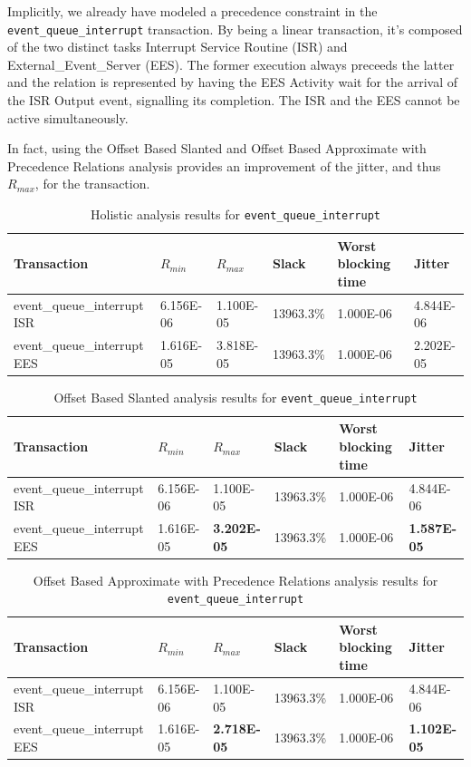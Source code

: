 \documentclass{article}
\begin{document}
Implicitly, we already have modeled a precedence constraint in the \texttt{event\_queue\_interrupt} transaction. By being a linear transaction, it's composed of the two distinct tasks Interrupt Service Routine (ISR) and External\_Event\_Server (EES). The former execution always preceeds the latter and the relation is represented by having the EES Activity wait for the arrival of the ISR Output event, signalling its completion. The ISR and the EES cannot be active simultaneously.

In fact, using the Offset Based Slanted and Offset Based Approximate with Precedence Relations analysis provides an improvement of the jitter, and thus $R_{max}$, for the transaction.

\begin{table}[!htbp]
  \centering
  \begin{tabular}{llllll}
    \toprule
    Transaction & $R_{min}$ & $R_{max}$ & Slack & Worst blocking time & Jitter \\
    \midrule
    event\_queue\_interrupt ISR & 6.156E-06 & 1.100E-05 & 13963.3\% & 1.000E-06 & 4.844E-06 \\
    event\_queue\_interrupt EES & 1.616E-05 & 3.818E-05 & 13963.3\% & 1.000E-06 & 2.202E-05 \\
    \bottomrule
  \end{tabular}
  \caption{Holistic analysis results for \texttt{event\_queue\_interrupt} }
  \label{tab:holistic-fps-event-queue}
\end{table}

\begin{table}[!htbp]
  \centering
  \begin{tabular}{llllll}
    \toprule
    Transaction & $R_{min}$ & $R_{max}$ & Slack & Worst blocking time & Jitter \\
    \midrule
    event\_queue\_interrupt ISR & 6.156E-06 & 1.100E-05 & 13963.3\% & 1.000E-06 & 4.844E-06 \\
    event\_queue\_interrupt EES & 1.616E-05 & \textbf{3.202E-05} & 13963.3\% & 1.000E-06 & \textbf{1.587E-05} \\
    \bottomrule
  \end{tabular}
  \caption{Offset Based Slanted analysis results for \texttt{event\_queue\_interrupt} }
  \label{tab:off-slanted-fps}
\end{table}

\begin{table}[!htbp]
  \centering
  \begin{tabular}{llllll}
    \toprule
    Transaction & $R_{min}$ & $R_{max}$ & Slack & Worst blocking time & Jitter \\
    \midrule
    event\_queue\_interrupt ISR & 6.156E-06 & 1.100E-05 & 13963.3\% & 1.000E-06 & 4.844E-06 \\
    event\_queue\_interrupt EES & 1.616E-05 & \textbf{2.718E-05} & 13963.3\% & 1.000E-06 & \textbf{1.102E-05} \\
    \bottomrule
  \end{tabular}
  \caption{Offset Based Approximate with Precedence Relations analysis results for \texttt{event\_queue\_interrupt} }
  \label{tab:off-approx-w-pr-fps}
\end{table}
\end{document}
